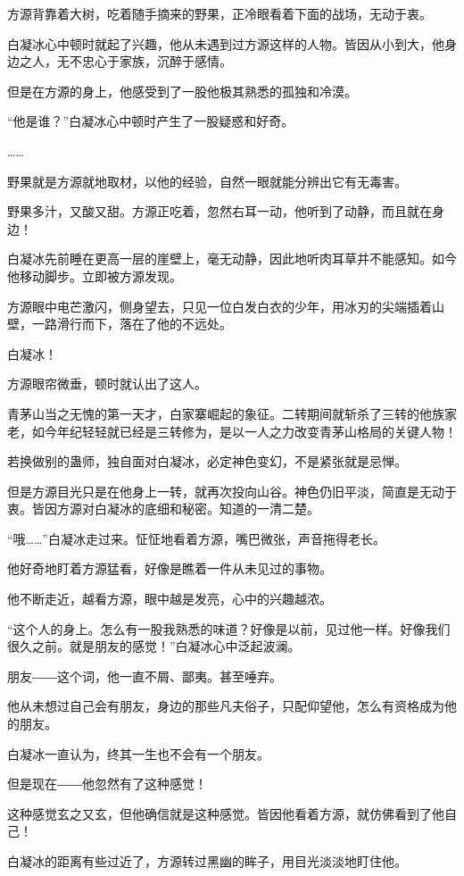 \begin{this_body}
方源背靠着大树，吃着随手摘来的野果，正冷眼看着下面的战场，无动于衷。

白凝冰心中顿时就起了兴趣，他从未遇到过方源这样的人物。皆因从小到大，他身边之人，无不忠心于家族，沉醉于感情。

但是在方源的身上，他感受到了一股他极其熟悉的孤独和冷漠。

“他是谁？”白凝冰心中顿时产生了一股疑惑和好奇。

……

野果就是方源就地取材，以他的经验，自然一眼就能分辨出它有无毒害。

野果多汁，又酸又甜。方源正吃着，忽然右耳一动，他听到了动静，而且就在身边！

白凝冰先前睡在更高一层的崖壁上，毫无动静，因此地听肉耳草并不能感知。如今他移动脚步。立即被方源发现。

方源眼中电芒激闪，侧身望去，只见一位白发白衣的少年，用冰刃的尖端插着山壁，一路滑行而下，落在了他的不远处。

白凝冰！

方源眼帘微垂，顿时就认出了这人。

青茅山当之无愧的第一天才，白家寨崛起的象征。二转期间就斩杀了三转的他族家老，如今年纪轻轻就已经是三转修为，是以一人之力改变青茅山格局的关键人物！

若换做别的蛊师，独自面对白凝冰，必定神色变幻，不是紧张就是忌惮。

但是方源目光只是在他身上一转，就再次投向山谷。神色仍旧平淡，简直是无动于衷。皆因方源对白凝冰的底细和秘密。知道的一清二楚。

“哦……”白凝冰走过来。怔怔地看着方源，嘴巴微张，声音拖得老长。

他好奇地盯着方源猛看，好像是瞧着一件从未见过的事物。

他不断走近，越看方源，眼中越是发亮，心中的兴趣越浓。

“这个人的身上。怎么有一股我熟悉的味道？好像是以前，见过他一样。好像我们很久之前。就是朋友的感觉！”白凝冰心中泛起波澜。

朋友――这个词，他一直不屑、鄙夷。甚至唾弃。

他从未想过自己会有朋友，身边的那些凡夫俗子，只配仰望他，怎么有资格成为他的朋友。

白凝冰一直认为，终其一生也不会有一个朋友。

但是现在――他忽然有了这种感觉！

这种感觉玄之又玄，但他确信就是这种感觉。皆因他看着方源，就仿佛看到了他自己！

白凝冰的距离有些过近了，方源转过黑幽的眸子，用目光淡淡地盯住他。


\end{this_body}
